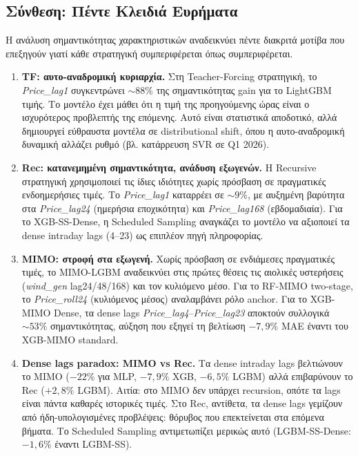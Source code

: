 \subsection{Σύνθεση: Πέντε Κλειδιά Ευρήματα}
\label{sec:fi_synthesis}

Η ανάλυση σημαντικότητας χαρακτηριστικών αναδεικνύει πέντε διακριτά μοτίβα
που επεξηγούν γιατί κάθε στρατηγική συμπεριφέρεται όπως συμπεριφέρεται.

\begin{enumerate}

\item \textbf{TF: αυτο-αναδρομική κυριαρχία.}
Στη Teacher-Forcing στρατηγική, το \textit{Price\_lag1} συγκεντρώνει
${\sim}88\%$ της σημαντικότητας gain για το LightGBM τιμής. Το μοντέλο
έχει μάθει ότι η τιμή της προηγούμενης ώρας είναι ο ισχυρότερος προβλεπτής
της επόμενης. Αυτό είναι στατιστικά αποδοτικό, αλλά δημιουργεί εύθραυστα
μοντέλα σε distributional shift, όπου η αυτο-αναδρομική δυναμική αλλάζει
ρυθμό (βλ. κατάρρευση SVR σε Q1 2026).

\item \textbf{Rec: κατανεμημένη σημαντικότητα, ανάδυση εξωγενών.}
Η Recursive στρατηγική χρησιμοποιεί τις ίδιες ιδιότητες χωρίς πρόσβαση σε πραγματικές ενδοημερήσιες τιμές.
Το \textit{Price\_lag1} καταρρέει σε ${\sim}9\%$, με αυξημένη βαρύτητα στα
\textit{Price\_lag24} (ημερήσια εποχικότητα) και \textit{Price\_lag168} (εβδομαδιαία).
Για το XGB-SS-Dense, η Scheduled Sampling αναγκάζει το μοντέλο να αξιοποιεί
τα dense intraday lags (4–23) ως επιπλέον πηγή πληροφορίας.

\item \textbf{MIMO: στροφή στα εξωγενή.}
Χωρίς πρόσβαση σε ενδιάμεσες πραγματικές τιμές, το MIMO-LGBM αναδεικνύει στις
πρώτες θέσεις τις αιολικές υστερήσεις (\textit{wind\_gen} lag24/48/168) και τον
κυλιόμενο μέσο. Για το RF-MIMO two-stage,
το \textit{Price\_roll24} (κυλιόμενος μέσος) αναλαμβάνει ρόλο anchor.
Για το XGB-MIMO Dense, τα dense lags \textit{Price\_lag4}–\textit{Price\_lag23}
αποκτούν συλλογικά ${\sim}53\%$ σημαντικότητας, αύξηση που εξηγεί τη
βελτίωση $-7{,}9\%$ MAE έναντι του XGB-MIMO standard.

\item \textbf{Dense lags paradox: MIMO vs Rec.}
Τα dense intraday lags βελτιώνουν το MIMO ($-22\%$ για MLP, $-7{,}9\%$ XGB,
$-6{,}5\%$ LGBM) αλλά επιβαρύνουν το Rec ($+2{,}8\%$ LGBM). Αιτία:
στο MIMO δεν υπάρχει recursion, οπότε τα lags είναι πάντα καθαρές
ιστορικές τιμές. Στο Rec, αντίθετα, τα dense lags γεμίζουν από
ήδη-υπολογισμένες προβλέψεις: θόρυβος που επεκτείνεται στα επόμενα βήματα.
Το Scheduled Sampling αντιμετωπίζει μερικώς αυτό (LGBM-SS-Dense: $-1{,}6\%$
έναντι LGBM-SS).


\end{enumerate}
